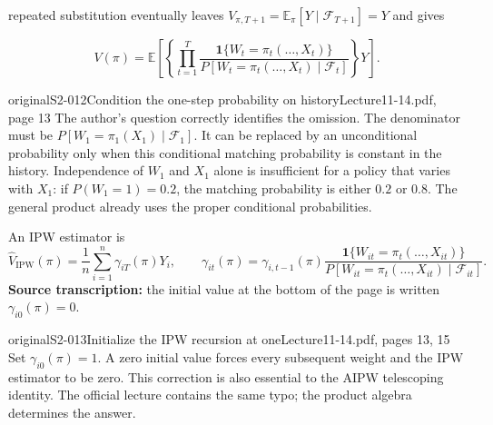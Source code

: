 repeated substitution eventually leaves $V_{\pi,T+1}=\mathbb E_\pi[Y\mid\mathcal F_{T+1}]=Y$ and gives



\[
 V(\pi)=\mathbb E\left[
 \left\{\prod_{t=1}^T
 \frac{\mathbf1\{W_t=\pi_t(\ldots,X_t)\}}
 {P[W_t=\pi_t(\ldots,X_t)\mid\mathcal F_t]}\right\}Y\right].
\]

\begin{reviewnote}{original}{S2-012}{Condition the one-step probability on history}{Lecture11-14.pdf, page 13}
The author's question correctly identifies the omission. The denominator must be $P[W_1=\pi_1(X_1)\mid\mathcal F_1]$. It can be replaced by an unconditional probability only when this conditional matching probability is constant in the history. Independence of $W_1$ and $X_1$ alone is insufficient for a policy that varies with $X_1$: if $P(W_1=1)=0.2$, the matching probability is either $0.2$ or $0.8$. The general product already uses the proper conditional probabilities.
\end{reviewnote}


An IPW estimator is
\[
 \widehat V_{\mathrm{IPW}}(\pi)=\frac1n\sum_{i=1}^n\gamma_{iT}(\pi)Y_i,
 \qquad
 \gamma_{it}(\pi)=\gamma_{i,t-1}(\pi)
 \frac{\mathbf1\{W_{it}=\pi_t(\ldots,X_{it})\}}
 {P[W_{it}=\pi_t(\ldots,X_{it})\mid\mathcal F_{it}]}.
\]
\textbf{Source transcription:} the initial value at the bottom of the page is written $\gamma_{i0}(\pi)=0$.

\begin{reviewnote}{original}{S2-013}{Initialize the IPW recursion at one}{Lecture11-14.pdf, pages 13, 15}
Set $\gamma_{i0}(\pi)=1$. A zero initial value forces every subsequent weight and the IPW estimator to be zero. This correction is also essential to the AIPW telescoping identity. The official lecture contains the same typo; the product algebra determines the answer.
\end{reviewnote}



